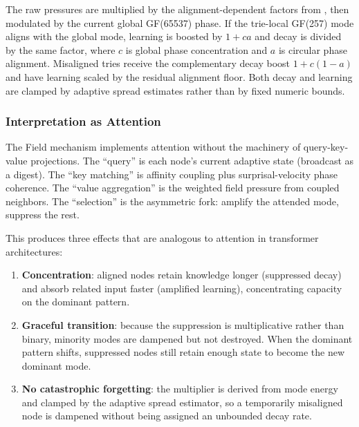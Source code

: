 The raw pressures are multiplied by the alignment-dependent factors from
, then modulated by the current global
GF(65537) phase.  If the trie-local GF(257) mode aligns with the global
mode, learning is boosted by $1 + c a$ and decay is divided by the same
factor, where $c$ is global phase concentration and $a$ is circular
phase alignment.  Misaligned tries receive the complementary decay boost
$1 + c(1-a)$ and have learning scaled by the residual alignment floor.
Both decay and learning are clamped by adaptive spread estimates rather
than by fixed numeric bounds.

\subsubsection{Interpretation as Attention}

The Field mechanism implements attention without the machinery of
query-key-value projections.  The ``query'' is each node's current
adaptive state (broadcast as a digest).  The ``key matching'' is
affinity coupling plus surprisal-velocity phase coherence.  The ``value
aggregation'' is the weighted field pressure from coupled neighbors.
The ``selection'' is the asymmetric fork: amplify the attended mode,
suppress the rest.

This produces three effects that are analogous to attention in
transformer architectures:

\begin{enumerate}[nosep]
  \item \textbf{Concentration}: aligned nodes retain knowledge longer
        (suppressed decay) and absorb related input faster (amplified
        learning), concentrating capacity on the dominant pattern.
  \item \textbf{Graceful transition}: because the suppression is
        multiplicative rather than binary, minority modes are dampened
        but not destroyed.  When the dominant pattern shifts, suppressed
        nodes still retain enough state to become the new dominant mode.
  \item \textbf{No catastrophic forgetting}: the multiplier is derived
        from mode energy and clamped by the adaptive spread estimator, so
        a temporarily misaligned node is dampened without being assigned
        an unbounded decay rate.
\end{enumerate}
